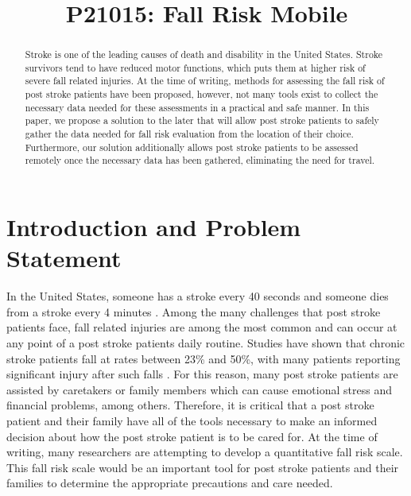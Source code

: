 \documentclass[conference]{IEEEtran}
\title{P21015: Fall Risk Mobile}
\author{\IEEEauthorblockN{Matt Krol}
\IEEEauthorblockA{mrk7339@rit.edu}
\and
\IEEEauthorblockN{Jacob DeFord}
\IEEEauthorblockA{jwd5062@rit.edu}
\and
\IEEEauthorblockN{Paul Kelly}
\IEEEauthorblockA{pjk2563@rit.edu}
\and
\IEEEauthorblockN{Doyle Bartholet}
\IEEEauthorblockA{cdb3120@rit.edu}}
\begin{document}
\maketitle

\begin{abstract}
Stroke is one of the leading causes of death and disability in the United States. Stroke survivors tend to have reduced motor functions, which puts them at higher risk of severe fall related injuries. At the time of writing, methods for assessing the fall risk of post stroke patients have been proposed, however, not many tools exist to collect the necessary data needed for these assessments in a practical and safe manner. In this paper, we propose a solution to the later that will allow post stroke patients to safely gather the data needed for fall risk evaluation from the location of their choice. Furthermore, our solution additionally allows post stroke patients to be assessed remotely once the necessary data has been gathered, eliminating the need for travel.
\end{abstract}

\section{Introduction and Problem Statement}

In the United States, someone has a stroke every 40 seconds and someone dies from a stroke every 4 minutes \cite{virani2020heart}. Among the many challenges that post stroke patients face, fall related injuries are among the most common and can occur at any point of a post stroke patients daily routine. Studies have shown that chronic stroke patients fall at rates between 23\% and 50\%, with many patients reporting significant injury after such falls \cite{harris2005relationship}. For this reason, many post stroke patients are assisted by caretakers or family members which can cause emotional stress and financial problems, among others. Therefore, it is critical that a post stroke patient and their family have all of the tools necessary to make an informed decision about how the post stroke patient is to be cared for. At the time of writing, many researchers are attempting to develop a quantitative fall risk scale. This fall risk scale would be an important tool for post stroke patients and their families to determine the appropriate precautions and care needed.
\end{document}

